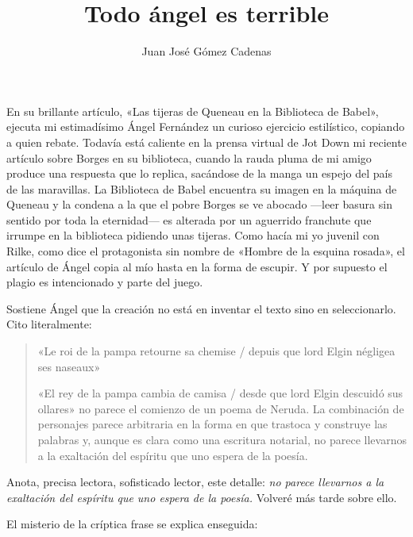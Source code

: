 \documentclass[11pt,a4paper]{article}
\title{Todo ángel es terrible}
\author{Juan José Gómez Cadenas}
\date{}
\begin{document}
\maketitle

En su brillante artículo, «Las tijeras de Queneau en la Biblioteca de Babel», ejecuta mi estimadísimo Ángel Fernández un curioso ejercicio estilístico, copiando a quien rebate. Todavía está caliente en la prensa virtual de Jot Down mi reciente artículo sobre Borges en su biblioteca, cuando la rauda pluma de mi amigo produce una respuesta que lo replica, sacándose de la manga un espejo del país de las maravillas. La Biblioteca de Babel encuentra su imagen en la máquina de Queneau y la condena a la que el pobre Borges se ve abocado ---leer basura sin sentido por toda la eternidad--- es alterada por un aguerrido franchute que irrumpe en la biblioteca pidiendo unas tijeras. Como hacía mi yo juvenil con Rilke, como dice el protagonista sin nombre de «Hombre de la esquina rosada», el artículo de Ángel copia al mío hasta en la forma de escupir. Y por supuesto el plagio es intencionado y parte del juego.

Sostiene Ángel que la creación no está en inventar el texto sino en seleccionarlo. Cito literalmente:

\begin{quotation}
«Le roi de la pampa retourne sa chemise / depuis que lord Elgin négligea ses naseaux»

«El rey de la pampa cambia de camisa / desde que lord Elgin descuidó sus ollares» no parece el comienzo de un poema de Neruda. La combinación de personajes parece arbitraria en la forma en que trastoca y construye las palabras y, aunque es clara como una escritura notarial, no parece llevarnos a la exaltación del espíritu que uno espera de la poesía.
\end{quotation}

Anota, precisa lectora, sofisticado lector, este detalle: \emph{no parece llevarnos a la exaltación del espíritu que uno espera de la poesía.} Volveré más tarde sobre ello.

El misterio de la críptica frase se explica enseguida:
\end{document}
